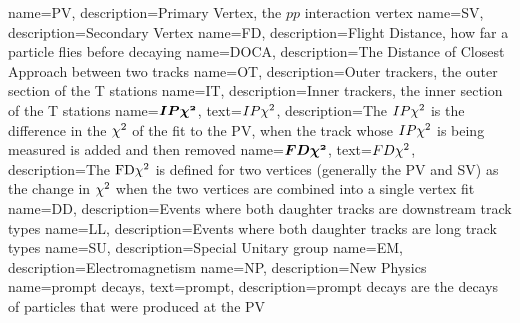                  {
                   name=PV,
                   description={Primary Vertex, the $pp$ interaction vertex}
                 }
                 {
                   name=SV,
                   description={Secondary Vertex}
                 }
                 {
                   name=FD,
                   description={Flight Distance, how far a particle flies before decaying}
                 }                                                                      
                 {
                   name=DOCA,
                   description={The Distance of Closest Approach between two tracks} 
                }
                 {
                   name=OT,
                   description={Outer trackers, the outer section of the T stations} 
                }
                 {
                   name=IT,
                   description={Inner trackers, the inner section of the T stations} 
                }                
                 {
                   name=$\mathbold{IP\chisq}$,
                   text=$IP\chi^2$,
                   description={The $IP\chi^2$ is the difference in the $\chi^2$ of the fit to the PV, when the track whose $IP\chi^2$ is being measured is added and then removed}
                 } 
                 {
                   name=$\mathbold{FD\chisq}$,
                   text=$FD\chi^2$,
                                    description={The $\mathrm{FD}\chi^2$ is defined for two vertices (generally the \Gls{PV} and \Gls{SV}) as the change in $\chi^2$ when the two vertices are combined into a single vertex fit}
                 }                
                 {
                   name=DD,
                   description={Events where both daughter tracks are downstream track types}
                 }
                 {
                   name=LL,
                   description={Events where both daughter tracks are long track types}
                 }
                 {
                   name=SU,
                   description={Special Unitary group}
                 }                 
                 {
                   name=EM,
                   description={Electromagnetism}
                 }                 
                 {
                   name=NP,
                   description={New Physics}
                 }
                 {
                   name=prompt decays,
                   text=prompt,
                   description={prompt decays are the decays of particles that were produced at the \Gls{PV}}
                 }
                 
